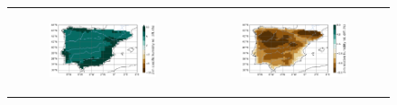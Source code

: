 \begin{figure}[htbp]
\begin{tabular}{cc}
        \begin{subfigure}[b]{0.5\textwidth}
            \caption{}
            \includegraphics[width=\textwidth]{images/chap4/future/reldiffmap_q2m_presfut.png}
        \end{subfigure} &
        \begin{subfigure}[b]{0.5\textwidth}
            \caption{}
            \includegraphics[width=\textwidth]{images/chap4/future/reldiffmap_rh2m_presfut.png}
        \end{subfigure} \\


\end{tabular}
\end{figure}
